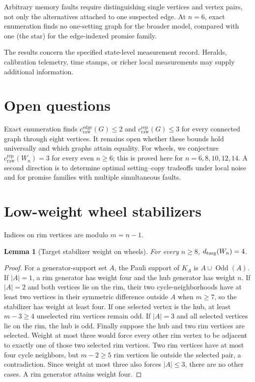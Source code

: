 \documentclass[11pt]{article}
\newtheorem{lemma}[theorem]{Lemma}
\theoremstyle{remark}
\newcommand{\ccutraw}{c_{\mathrm{raw}}^{\mathrm{edge}}}
\newcommand{\crep}{c_{\mathrm{raw}}^{\mathrm{rep}}}
\begin{document}
Arbitrary memory faults require distinguishing single vertices and vertex pairs, not only the alternatives attached to one suspected edge.  At $n=6$, exact enumeration finds no one-setting graph for the broader model, compared with one (the star) for the edge-indexed promise family.

The results concern the specified state-level measurement record.  Heralds, calibration telemetry, time stamps, or richer local measurements may supply additional information.

\section{Open questions}\label{sec:open}
Exact enumeration finds $\ccutraw(G)\le2$ and $\crep(G)\le3$ for every connected graph through eight vertices.  It remains open whether these bounds hold universally and which graphs attain equality.  For wheels, we conjecture $\crep(W_n)=3$ for every even $n\ge6$; this is proved here for $n=6,8,10,12,14$.  A second direction is to determine optimal setting--copy tradeoffs under local noise and for promise families with multiple simultaneous faults.

\appendix
\section{Low-weight wheel stabilizers}\label{app:wheelweightproof}
Indices on rim vertices are modulo $m=n-1$.

\begin{lemma}[Target stabilizer weight on wheels]\label{lem:wheeltargetweight}
For every $n\ge8$, $d_{\rm targ}(W_n)=4$.
\end{lemma}
\begin{proof}
For a generator-support set $A$, the Pauli support of $K_A$ is $A\cup\operatorname{Odd}(A)$. If $|A|=1$, a rim generator has weight four and the hub generator has weight $n$. If $|A|=2$ and both vertices lie on the rim, their two cycle-neighborhoods have at least two vertices in their symmetric difference outside $A$ when $m\ge7$, so the stabilizer has weight at least four. If one selected vertex is the hub, at least $m-3\ge4$ unselected rim vertices remain odd. If $|A|=3$ and all selected vertices lie on the rim, the hub is odd. Finally suppose the hub and two rim vertices are selected. Weight at most three would force every other rim vertex to be adjacent to exactly one of those two selected rim vertices. Two rim vertices have at most four cycle neighbors, but $m-2\ge5$ rim vertices lie outside the selected pair, a contradiction. Since weight at most three also forces $|A|\le3$, there are no other cases. A rim generator attains weight four.
\end{proof}
\end{document}
